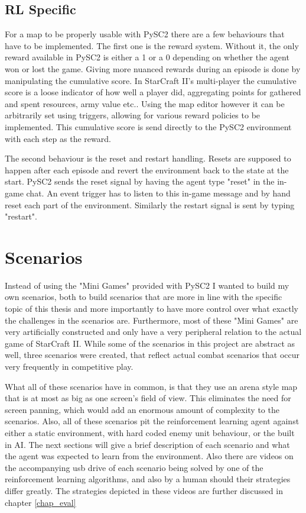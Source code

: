 \subsection{RL Specific}
For a map to be properly usable with PySC2 there are a few behaviours that have to be implemented.
The first one is the reward system. Without it, the only reward available in PySC2 is either a 1 or a 0 depending on whether the agent won or lost the game. Giving more nuanced rewards during an episode is done by manipulating the cumulative score. In StarCraft II's multi-player the cumulative score is a loose indicator of how well a player did, aggregating points for gathered and spent resources, army value etc.. Using the map editor however it can be arbitrarily set using triggers, allowing for various reward policies to be implemented. This cumulative score is send directly to the PySC2 environment with each step as the reward.

The second behaviour is the reset and restart handling. Resets are supposed to happen after each episode and revert the environment back to the state at the start. PySC2 sends the reset signal by having the agent type "reset" in the in-game chat. An event trigger has to listen to this in-game message and by hand reset each part of the environment. Similarly the restart signal is sent by typing "restart". 

\section{Scenarios}
\label{sec:scenarios}
Instead of using the "Mini Games" provided with PySC2 I wanted to build my own scenarios, both to build scenarios that are more in line with the specific topic of this thesis and more importantly to have more control over what exactly the challenges in the scenarios are.
Furthermore, most of these "Mini Games" are very artificially constructed and only have a very peripheral relation to the actual game of StarCraft II. While some of the scenarios in this project are abstract as well, three scenarios were created, that reflect actual combat scenarios that occur very frequently in competitive play.

What all of these scenarios have in common, is that they use an arena style map that is at most as big as one screen's field of view. This eliminates the need for screen panning, which would add an enormous amount of complexity to the scenarios.
Also, all of these scenarios pit the reinforcement learning agent against either a static environment, with hard coded enemy unit behaviour, or the built in AI.
The next sections will give a brief description of each scenario and what the agent was expected to learn from the environment. Also there are videos on the accompanying usb drive of each scenario being solved by one of the reinforcement learning algorithms, and also by a human should their strategies differ greatly. The strategies depicted in these videos are further discussed in chapter \ref{chap_eval}

